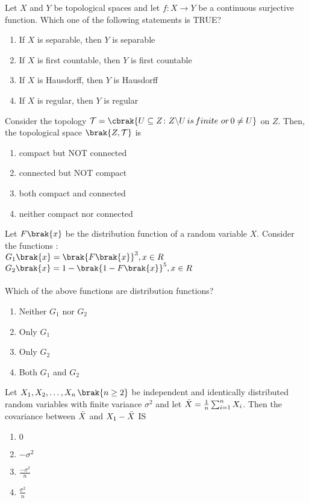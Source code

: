     \item Let $X$ and $Y$ be topological spaces and let $f\colon X\to Y$ be a continuous surjective function. Which one of the following statements is TRUE?\
    \begin{enumerate}
        \item If $X$ is separable, then $Y$ is separable 
        \item If $X$ is first countable, then $Y$ is first countable 
        \item If $X$ is Hausdorff, then $Y$ is Hausdorff
        \item If $X$ is regular, then $Y$ is regular
    \end{enumerate}
    \item Consider the topology $\mathcal{T}=\cbrak{U\subseteq Z\colon Z\backslash U\,is\,finite\,\,or\,0\neq U}$ on $Z$. Then, the topological space $\brak{Z,\mathcal{T}}$ is
    \begin{enumerate}
        \item compact but NOT connected
        \item connected but NOT compact
        \item both compact and connected
        \item neither compact nor connected
    \end{enumerate}
    \item Let $F\brak{x}$ be the distribution function of a random variable $X$. Consider the functions $\colon$\\
    $G_1\brak{x}=\brak{F\brak{x}}^3,x\in R$\\
    $G_2\brak{x}=1-\brak{1-F\brak{x}}^5,x\in R$\\ \\
    Which of the above functions are distribution functions?
    \begin{enumerate}
        \item Neither $G_1$ nor $G_2$
        \item Only $G_1$ 
        \item Only $G_2$
        \item Both $G_1$ and $G_2$
    \end{enumerate}
    \item Let $X_1,X_2,\dots,X_n\,\brak{n\geq 2}$ be independent and identically distributed random variables with finite variance $\sigma^2$ and let $\Bar{X}=\frac{1}{n}\sum_{i=1}^{n}X_i$. Then the covariance between $\Bar{X}$ and $X_1-\Bar{X}$ IS
    \begin{enumerate}
        \item $0$
        \item $-\sigma^2$
        \item $\frac{-\sigma^2}{n}$
        \item $\frac{\sigma^2}{n}$
    \end{enumerate}
